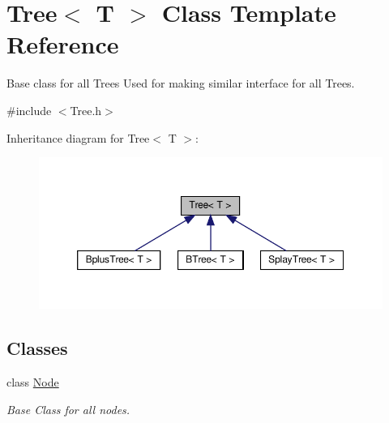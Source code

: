 \hypertarget{classTree}{}\section{Tree$<$ T $>$ Class Template Reference}
\label{classTree}


Base class for all Trees  Used for making similar interface for all Trees.  




{\ttfamily \#include $<$Tree.\+h$>$}



Inheritance diagram for Tree$<$ T $>$\+:\nopagebreak
\begin{figure}[H]
\begin{center}
\leavevmode
\includegraphics[width=350pt]{classTree__inherit__graph}
\end{center}
\end{figure}
\subsection*{Classes}
\begin{DoxyCompactItemize}
\item 
class \hyperlink{classTree_1_1Node}{Node}
\begin{DoxyCompactList}\small\item\em Base Class for all nodes. \end{DoxyCompactList}\end{DoxyCompactItemize}
